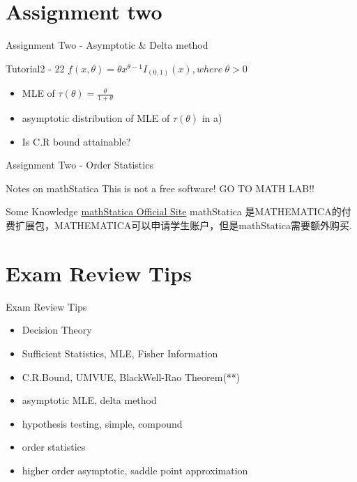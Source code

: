 \documentclass{beamer}
\begin{document}
\section{Assignment two}
    \begin{frame}{Assignment Two - Asymptotic \& Delta method}
    \begin{exampleblock}{Tutorial2 - 22}
        $f(x,\theta)=\theta x^{\theta-1}I_{(0,1)}(x), where\ \theta > 0$\\
        \begin{itemize}
            \item MLE of $\tau(\theta)=\frac{\theta}{1+\theta}$
            \item asymptotic distribution of MLE of $\tau(\theta)$ in a)
            \item Is C.R bound attainable?
        \end{itemize}
    \end{exampleblock}
    \end{frame}
    
    \begin{frame}{Assignment Two - Order Statistics}
        \begin{alertblock}{Notes on mathStatica}
            This is not a free software! GO TO MATH LAB!!\\
        \end{alertblock}
        
        \begin{block}{Some Knowledge}
            \href{http://www.mathstatica.com/software/buy.html}{mathStatica Official Site}
            mathStatica 是MATHEMATICA的付费扩展包，MATHEMATICA可以申请学生账户，但是mathStatica需要额外购买.
        \end{block}
        
    \end{frame}

\section{Exam Review Tips}
    \begin{frame}{Exam Review Tips}
        \begin{itemize}
            \item Decision Theory
            \item Sufficient Statistics, MLE, Fisher Information
            \item C.R.Bound, UMVUE, BlackWell-Rao Theorem(**)
            \item asymptotic MLE, delta method
            \item hypothesis testing, simple, compound
            \item order statistics
            \item higher order asymptotic, saddle point approximation
        \end{itemize}
    \end{frame}
    
\end{document}
